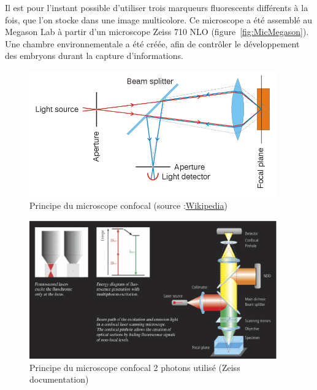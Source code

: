 Il est pour l'instant possible d'utiliser trois marqueurs fluorescents différents à la fois, que l'on stocke dans une image multicolore.
Ce microscope a été assemblé au Megason Lab à partir d'un microscope Zeiss 710 NLO (figure~\ref{fig:MicMegason}).
Une chambre environnementale a été créée, afin de contrôler le développement des embryons durant la capture d'informations.

\begin{figure}[htb]
\begin{center}
\leavevmode
\includegraphics[width=0.95\textwidth]{pictures/ConfocalPrinciple}
\end{center}
\caption{Principe du microscope confocal (source :\href{http://en.wikipedia.org/wiki/File:Confocalprinciple.svg}{Wikipedia})}
\label{fig:ConfocalPrinciple}
\end{figure}

\begin{figure}[htb]
\begin{center}
\leavevmode
\includegraphics[width=0.95\textwidth]{pictures/ConfocalZeissPrinciple}
\end{center}
\caption{Principe du microscope confocal 2 photons utilisé (Zeiss documentation)}
\label{fig:Confocal2photonsPrinciple}
\end{figure}

